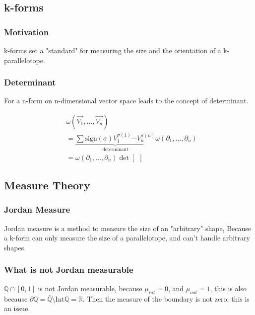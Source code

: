 \documentclass[12pt]{armath}
\newcommand{\R}{\mathbb{R}}
\newcommand{\Q}{\mathbb{Q}}
\begin{document}
  \subsection{k-forms}%
  \label{sub:k_forms}

  \subsubsection{Motivation}%
  \label{ssub:motivation}

  k-forms set a "standard" for measuring the size and the orientation of a
  k-parallelotope.

  \subsubsection{Determinant}%
  \label{ssub:determinant}

  For a n-form on n-dimensional vector space leads to the concept of determinant.

  \begin{align*}
  &\omega(\vec{V_1},\ldots,\vec{V_n})\\
  &=\underbrace{\sum\text{sign}(\sigma)V_1^{\sigma(1)}\cdots
  V_n^{\sigma(n)}}_\text{determinant}\omega(\partial_1,\ldots,\partial_n)\\
  &=\omega(\partial_1,\ldots,\partial_n)\det\left[\ \ \right]
  \end{align*}

  \subsection{Measure Theory}%
  \label{sub:measure_theory}

  \subsubsection{Jordan Measure}%
  \label{ssub:jordan_measure}

  Jordan measure is a method to measure the size of an "arbitrary" shape, Because
  a k-form can only measure the size of a parallelotope, and can't handle
  arbitrary shapes.

  \subsubsection{What is not Jordan measurable}%
  \label{ssub:what_is_not_jordan_measurable}

  $\Q\cap[0,1]$ is not Jordan measurable, because $\mu_{int}=0$, and
  $\mu_{out}=1$, this is also because $\partial
  \Q=\bar{\Q}\setminus\text{Int}{\Q}=\R$. Then the measure of the boundary is not
  zero, this is an issue.
\end{document}
